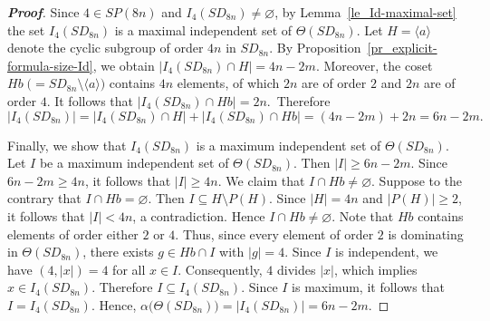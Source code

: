 \documentclass{amsart}
\theoremstyle{plain}
\theoremstyle{definition}
\begin{document}
\begin{proof}[\textbf{Proof}]
Since $4\in SP(8n)$ and $I_4(SD_{8n})\neq \varnothing$, by Lemma~\ref{le_Id-maximal-set} the set $I_4(SD_{8n})$ is a maximal independent set of $\Theta(SD_{8n})$. Let $H=\langle a \rangle$ denote the cyclic subgroup of order $4n$ in $SD_{8n}$. By Proposition~\ref{pr_explicit-formula-size-Id}, we obtain $|I_4(SD_{8n})\cap H|=4n-2m$. Moreover, the coset $Hb\;  \bigl(= SD_{8n}\setminus \langle a \rangle\bigr)$ contains $4n$ elements, of which $2n$ are of order $2$ and $2n$ are of order $4$. It follows that $|I_4(SD_{8n})\cap Hb|=2n$. Therefore
\[|I_4(SD_{8n})| = |I_4(SD_{8n})\cap H|+ |I_4(SD_{8n})\cap Hb| = (4n-2m) + 2n= 6n-2m.\]

Finally, we show that $I_4(SD_{8n})$ is a maximum independent set of $\Theta(SD_{8n})$. Let $I$ be a maximum independent set of $\Theta(SD_{8n})$. Then $|I| \geq 6n-2m$. Since $6n-2m \geq 4n$, it follows that $|I|\geq 4n$. We claim that $I\cap Hb\neq\varnothing$. Suppose to the contrary that $I\cap Hb=\varnothing$. Then $I \subseteq H\setminus P(H)$. Since $|H| = 4n$ and $|P(H)| \geq 2$, it follows that $|I| < 4n$, a contradiction. Hence $I\cap Hb\neq\varnothing$. Note that $Hb$ contains elements of order either $2$ or $4$. Thus, since every element of order $2$ is dominating in $\Theta(SD_{8n})$, there exists $g\in Hb\cap I$ with $|g| = 4$. Since $I$ is independent, we have $(4, |x|)=4$ for all $x\in I$. Consequently, $4$ divides $|x|$, which implies $x\in I_4(SD_{8n})$. Therefore $I \subseteq I_4(SD_{8n})$. Since $I$ is maximum, it follows that $I = I_4(SD_{8n})$. Hence, $\alpha\bigl(\Theta(SD_{8n})\bigr)= |I_4(SD_{8n})| =6n-2m$.  
\end{proof}


%
%
\end{document}
